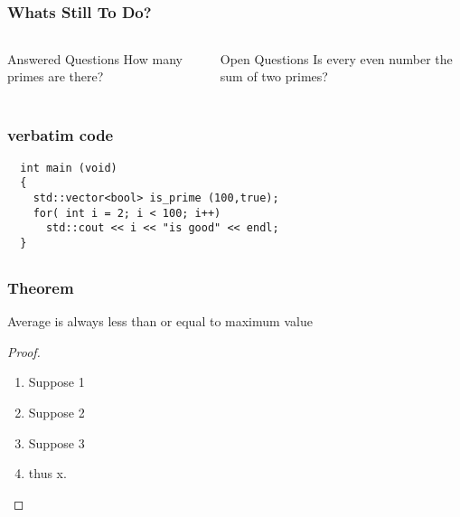 \documentclass[ignorenonframetext,]{beamer}
\begin{document}
\subsection{}
\begin{frame}
  \frametitle{Whats Still To Do?}
  \begin{columns}
    \begin{block}{Answered Questions}
      How many primes are there?
    \end{block}
    \pause
    \begin{block}{Open Questions}
      Is every even number the sum of two primes?
    \end{block}
  \end{columns}
\end{frame}

\subsection{}
\begin{frame}[fragile]
  \frametitle{verbatim code}
  \begin{verbatim}
  int main (void)
  {
    std::vector<bool> is_prime (100,true);
    for( int i = 2; i < 100; i++)
      std::cout << i << "is good" << endl;
  }
  \end{verbatim}
\end{frame}

\subsection{}
\begin{frame}
  \frametitle{Theorem}
  \begin{theorem}
    Average is always less than or equal to maximum value
  \end{theorem}
  \begin{proof}
    \begin{enumerate}
      \item<1-| alert@1> Suppose 1
      \item<2-> Suppose 2
      \item<3-> Suppose 3
      \item<1-> thus x. \qedhere
    \end{enumerate}
  \end{proof}
\end{frame}
\end{document}
